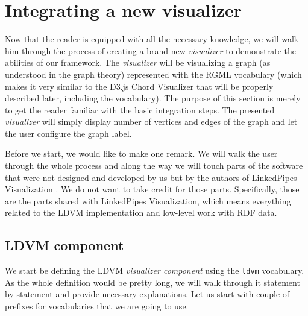 
\section{Integrating a new visualizer}
\label{sec:implementation:integrating-visualizer}

Now that the reader is equipped with all the necessary knowledge, we will walk him through the process of creating a brand new \emph{visualizer} to demonstrate the abilities of our framework. The \emph{visualizer} will be visualizing a graph (as understood in the graph theory) represented with the RGML vocabulary (which makes it very similar to the D3.js Chord Visualizer that will be properly described later, including the vocabulary). The purpose of this section is merely to get the reader familiar with the basic integration steps. The presented \emph{visualizer} will simply display number of vertices and edges of the graph and let the user configure the graph label.

Before we start, we would like to make one remark. We will walk the user through the whole process and along the way we will touch parts of the software that were not designed and developed by us but by the authors of LinkedPipes Visualization \cite{linked_pipes_visualization}. We do not want to take credit for those parts. Specifically, those are the parts shared with LinkedPipes Visualization, which means everything related to the LDVM implementation and low-level work with RDF data.

\subsection{LDVM component}

We start be defining the LDVM \emph{visualizer component} using the \texttt{ldvm} vocabulary. As the whole definition would be pretty long, we will walk through it statement by statement and provide necessary explanations. Let us start with couple of prefixes for vocabularies that we are going to use.

